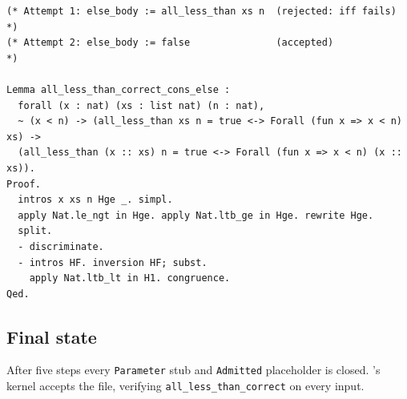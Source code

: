 \begin{lstlisting}
(* Attempt 1: else_body := all_less_than xs n  (rejected: iff fails) *)
(* Attempt 2: else_body := false               (accepted)            *)

Lemma all_less_than_correct_cons_else :
  forall (x : nat) (xs : list nat) (n : nat),
  ~ (x < n) -> (all_less_than xs n = true <-> Forall (fun x => x < n) xs) ->
  (all_less_than (x :: xs) n = true <-> Forall (fun x => x < n) (x :: xs)).
Proof.
  intros x xs n Hge _. simpl.
  apply Nat.le_ngt in Hge. apply Nat.ltb_ge in Hge. rewrite Hge.
  split.
  - discriminate.
  - intros HF. inversion HF; subst.
    apply Nat.ltb_lt in H1. congruence.
Qed.
\end{lstlisting}

\subsection{Final state}

After five steps every \texttt{Parameter} stub and \texttt{Admitted} placeholder is closed. \coq{}'s kernel accepts the file, verifying \texttt{all\_less\_than\_correct} on every input.

